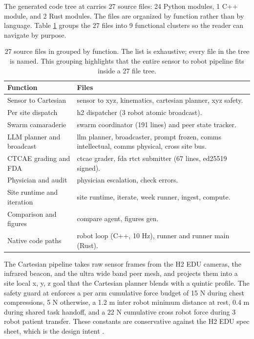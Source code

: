 \begin{sectionaccent}
The generated code tree at  carries 27 source
files: 24 Python modules, 1 C++ module, and 2 Rust modules. The files
are organized by function rather than by language. Table
\ref{tbl:src-by-function} groups the 27 files into 9 functional
clusters so the reader can navigate by purpose.

\begin{table}[H]
\captionsetup{type=table}
\caption{27 source files in  grouped by
function. The list is exhaustive; every file in the tree is named.
This grouping highlights that the entire sensor to robot pipeline
fits inside a 27 file tree.}
\label{tbl:src-by-function}
\small
\begin{tabular}{>{\raggedright\arraybackslash}p{4.6cm}
                >{\raggedright\arraybackslash}p{10.4cm}}
\toprule
\textbf{Function} & \textbf{Files} \\
\midrule
Sensor to Cartesian & sensor to xyz, kinematics, cartesian planner, xyz safety. \\
Per site dispatch & h2 dispatcher (3 robot atomic broadcast). \\
Swarm camaraderie & swarm coordinator (191 lines) and peer state tracker. \\
LLM planner and broadcast & llm planner, broadcaster, prompt frozen, comms intellectual, comms physical, cross site bus. \\
CTCAE grading and FDA & ctcae grader, fda rtct submitter (67 lines, ed25519 signed). \\
Physician and audit & physician escalation, check errors. \\
Site runtime and iteration & site runtime, iterate, week runner, ingest, compute. \\
Comparison and figures & compare agent, figures gen. \\
Native code paths & robot loop (C++, 10 Hz), runner and runner main (Rust). \\
\bottomrule
\end{tabular}
\end{table}

The Cartesian pipeline takes raw sensor frames from the H2 EDU
cameras, the infrared beacon, and the ultra wide band peer mesh, and
projects them into a site local x, y, z goal that the Cartesian
planner blends with a quintic profile. The safety guard at
 enforces a per arm cumulative force budget of 15
N during chest compressions, 5 N otherwise, a 1.2 m inter robot
minimum distance at rest, 0.4 m during shared task handoff, and a
22 N cumulative cross robot force during 3 robot patient transfer.
These constants are conservative against the H2 EDU spec sheet, which
is the design intent
\cite{unitree_h2_2026, iec_80601_2_77}.


\end{sectionaccent}
